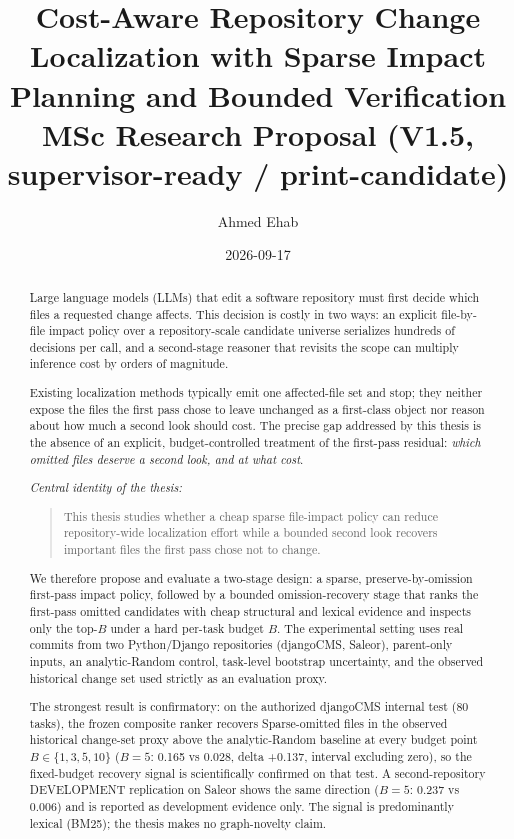 \documentclass[11pt,a4paper]{article}
\title{\textbf{Cost-Aware Repository Change Localization with Sparse Impact\\[2pt]
Planning and Bounded Verification}\\[6pt]
\large MSc Research Proposal (V1.5, supervisor-ready / print-candidate)}
\author{Ahmed Ehab}
\date{2026-09-17}
\begin{document}
\maketitle

\begin{abstract}
Large language models (LLMs) that edit a software repository must first decide
which files a requested change affects. This decision is costly in two ways:
an explicit file-by-file impact policy over a repository-scale candidate
universe serializes hundreds of decisions per call, and a second-stage
reasoner that revisits the scope can multiply inference cost by orders of
magnitude.

Existing localization methods typically emit one affected-file set and stop;
they neither expose the files the first pass chose to leave unchanged as a
first-class object nor reason about how much a second look should cost. The
precise gap addressed by this thesis is the absence of an explicit,
budget-controlled treatment of the first-pass residual: \emph{which omitted
files deserve a second look, and at what cost}.

\emph{Central identity of the thesis:}

\begin{quote}
This thesis studies whether a cheap sparse file-impact policy can reduce
repository-wide localization effort while a bounded second look recovers
important files the first pass chose not to change.
\end{quote}

We therefore propose and evaluate a two-stage design: a sparse,
preserve-by-omission first-pass impact policy, followed by a bounded
omission-recovery stage that ranks the first-pass omitted candidates with
cheap structural and lexical evidence and inspects only the top-$B$ under a
hard per-task budget $B$. The experimental setting uses real commits from two
Python/Django repositories (djangoCMS, Saleor), parent-only inputs, an
analytic-Random control, task-level bootstrap uncertainty, and the observed
historical change set used strictly as an evaluation proxy.

The strongest result is confirmatory: on the authorized djangoCMS internal
test (80 tasks), the frozen composite ranker recovers Sparse-omitted files in
the observed historical change-set proxy above the analytic-Random baseline
at every budget point $B \in \{1,3,5,10\}$ ($B{=}5$: 0.165 vs 0.028, delta
+0.137, interval excluding zero), so the fixed-budget recovery signal is
scientifically confirmed on that test. A second-repository DEVELOPMENT
replication on Saleor shows the same direction ($B{=}5$: 0.237 vs 0.006) and
is reported as development evidence only. The signal is predominantly lexical
(BM25); the thesis makes no graph-novelty claim.


\end{abstract}
\end{document}

